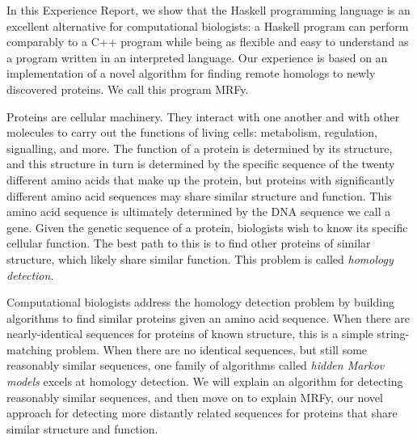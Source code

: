 \documentclass[preprint]{sigplanconf}
\begin{document}
In this Experience Report, we show that the Haskell programming language is an 
excellent alternative for computational biologists: a Haskell program can 
perform comparably to a C++ program while being as flexible and easy to 
understand as a program written in an interpreted language. Our experience is 
based on an implementation of a novel algorithm for finding remote homologs to 
newly discovered proteins. We call this program MRFy.

Proteins are cellular machinery. They interact with one another and with other 
molecules to carry out the functions of living cells: metabolism, regulation, 
signalling, and more. The function of a protein is determined by its structure, 
and this structure in turn is determined by the specific sequence of the twenty 
different amino acids that make up the protein, but proteins with significantly 
different amino acid sequences may share similar structure and function. This 
amino acid sequence is ultimately determined by the DNA sequence we call a 
gene. Given the genetic sequence of a protein, biologists wish to know its 
specific cellular function. The best path to this is to find other proteins of 
similar structure, which likely share similar function. This problem is called 
\textit{homology detection}.

Computational biologists address the homology detection problem by building 
algorithms to find similar proteins given an amino acid sequence. When there 
are nearly-identical sequences for proteins of known structure, this is a 
simple string-matching problem. When there are no identical sequences, but 
still some reasonably similar sequences, one family of algorithms called 
\textit{hidden Markov models} excels at homology detection. We will explain an 
algorithm for detecting reasonably similar sequences, and then move on to 
explain MRFy, our novel approach for detecting more distantly related sequences 
for proteins that share similar structure and function.


\end{document}

